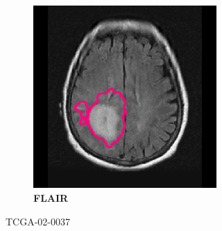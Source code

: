 \begin{subappendices}
\begin{figure}[htbp]
\begin{subfigure}[b]{0.8\textwidth}
\begin{subfigure}[b]{0.215\textwidth}
        \end{subfigure}
        \hfill
        \begin{subfigure}[b]{0.215\textwidth}
        \caption*{\normalfont \textbf{\acrshort{FLAIR}}\nopunct}
        \includegraphics[width=\textwidth, clip, trim=2.5cm 0.5cm 2.5cm 0.5cm]{Figures/Random_segs/FLAIR_TCGA-02-0037.png}
        \end{subfigure}
        \caption{TCGA-02-0037}
    \end{subfigure}
    \begin{subfigure}[b]{0.8\textwidth}
        \centering
        \hfill
        \begin{subfigure}[b]{0.215\textwidth}

\end{subfigure}
\end{subfigure}
\end{figure}
\end{subappendices}
